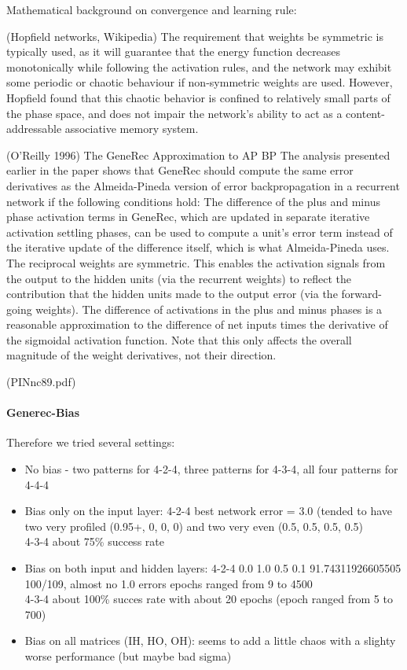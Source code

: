  Mathematical background on convergence and learning rule: 

(Hopfield networks, Wikipedia) The requirement that weights be symmetric is typically used, as it will guarantee that the energy function decreases monotonically while following the activation rules, and the network may exhibit some periodic or chaotic behaviour if non-symmetric weights are used. However, Hopfield found that this chaotic behavior is confined to relatively small parts of the phase space, and does not impair the network's ability to act as a content-addressable associative memory system.

(O'Reilly 1996) The GeneRec Approximation to AP BP
The analysis presented earlier in the paper shows that GeneRec should compute the same error derivatives as the Almeida-Pineda version of error backpropagation in a recurrent network if the following conditions hold:
  The difference of the plus and minus phase activation terms in GeneRec, which are updated in separate iterative activation settling phases, can be used to compute a unit’s error term instead of the iterative update of the difference itself, which is what Almeida-Pineda uses.
  The reciprocal weights are symmetric. This enables the activation signals from the output to the hidden units (via the recurrent weights) to reflect the contribution that the hidden units made to the output error (via the forward-going weights).
  The difference of activations in the plus and minus phases is a reasonable approximation to the difference of net inputs times the derivative of the sigmoidal activation function. Note that this only affects the overall magnitude of the weight derivatives, not their direction.
  
(PINnc89.pdf) 

\paragraph{Generec-Bias} 
Therefore we tried several settings: 
\begin{itemize} 
\item No bias - two patterns for 4-2-4, three patterns for 4-3-4, all four patterns for 4-4-4
\item Bias only on the input layer:  
4-2-4 best network error = 3.0 (tended to have two very profiled (0.95+, 0, 0, 0) and two very even (0.5, 0.5, 0.5, 0.5)  \\
4-3-4 about 75\% success rate 
\item Bias on both input and hidden layers: 
    4-2-4 0.0 1.0 0.5 0.1 91.74311926605505 100/109, almost no 1.0 errors 
          epochs ranged from 9 to 4500 \\ 
    4-3-4 about 100\% succes rate with about 20 epochs (epoch ranged from 5 to 700) 
\item Bias on all matrices (IH, HO, OH): 
    seems to add a little chaos with a slighty worse performance (but maybe bad sigma)

\end{itemize} 

